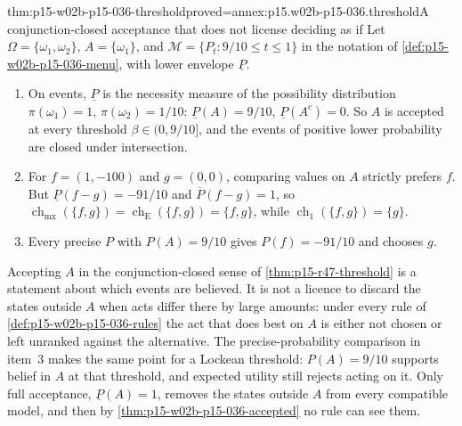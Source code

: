 \begin{hbtheorem}{thm:p15-w02b-p15-036-threshold}{proved=annex:p15.w02b-p15-036.threshold}{A conjunction-closed acceptance that does not license deciding as if}
Let \(\Omega=\{\omega_1,\omega_2\}\), \(A=\{\omega_1\}\), and
\(\mathcal M=\{P_t:9/10\leq t\leq1\}\) in the notation of
\cref{def:p15-w02b-p15-036-menu}, with lower envelope \(\underline P\).
\begin{enumerate}
\item On events, \(\underline P\) is the necessity measure of the
 possibility distribution \(\pi(\omega_1)=1\), \(\pi(\omega_2)=1/10\):
 \(\underline P(A)=9/10\), \(\underline P(A^c)=0\). So \(A\) is accepted
 at every threshold \(\beta\in(0,9/10]\), and the events of positive
 lower probability are closed under intersection.
\item For \(f=(1,-100)\) and \(g=(0,0)\), comparing values on \(A\)
 strictly prefers \(f\). But \(\underline P(f-g)=-91/10\) and
 \(\overline P(f-g)=1\), so
 \(\operatorname{ch}_{\mathrm{mx}}(\{f,g\})=
 \operatorname{ch}_{\mathrm E}(\{f,g\})=\{f,g\}\), while
 \(\operatorname{ch}_1(\{f,g\})=\{g\}\).
\item Every precise \(P\) with \(P(A)=9/10\) gives \(P(f)=-91/10\) and
 chooses \(g\).
\end{enumerate}
\end{hbtheorem}

Accepting \(A\) in the conjunction-closed sense of
\cref{thm:p15-r47-threshold} is a statement about which events are
believed. It is not a licence to discard the states outside \(A\) when
acts differ there by large amounts: under every rule of
\cref{def:p15-w02b-p15-036-rules} the act that does best on \(A\) is
either not chosen or left unranked against the alternative. The
precise-probability comparison in item~3 makes the same point for a
Lockean threshold: \(P(A)=9/10\) supports belief in \(A\) at that
threshold, and expected utility still rejects acting on it. Only full
acceptance, \(\underline P(A)=1\), removes the states outside \(A\) from
every compatible model, and then by
\cref{thm:p15-w02b-p15-036-accepted} no rule can see them.


